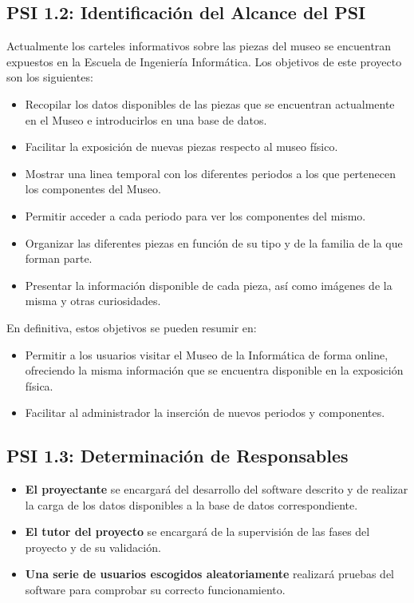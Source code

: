 \subsection{PSI 1.2: Identificación del Alcance del PSI}
Actualmente los carteles informativos sobre las piezas del museo se encuentran expuestos en la Escuela de Ingeniería Informática. Los objetivos de este proyecto son los siguientes:
\begin{itemize}
	\item Recopilar los datos disponibles de las piezas que se encuentran actualmente en el Museo e introducirlos en una base de datos.	
	\item Facilitar la exposición de nuevas piezas respecto al museo físico.
	\item Mostrar una linea temporal con los diferentes periodos a los que pertenecen los componentes del Museo. 
	\item Permitir acceder a cada periodo para ver los componentes del mismo.
	\item Organizar las diferentes piezas en función de su tipo y de la familia de la que forman parte.
	\item Presentar la información disponible de cada pieza, así como imágenes de la misma y otras curiosidades.
\end{itemize}
En definitiva, estos objetivos se pueden resumir en:
\begin{itemize}
	\item Permitir a los usuarios visitar el Museo de la Informática de forma online, ofreciendo la misma información que se encuentra disponible en la exposición física.
	\item Facilitar al administrador la inserción de nuevos periodos y componentes.
\end{itemize}

\subsection{PSI 1.3: Determinación de Responsables}
\begin{itemize}
	\item \textbf{El proyectante} se encargará del desarrollo del software descrito y de realizar la carga de los datos disponibles a la base de datos correspondiente.
	\item\textbf{El tutor del proyecto} se encargará de la supervisión de las fases del proyecto y de su validación.
	\item \textbf{Una serie de usuarios escogidos aleatoriamente} realizará pruebas del software para comprobar su correcto funcionamiento.
\end{itemize}


